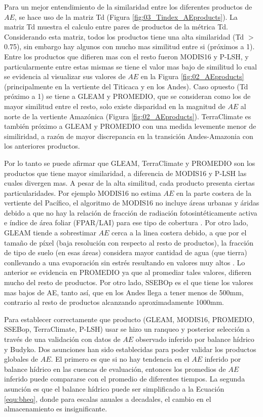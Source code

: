 \documentclass[12pt]{article}
\begin{document}
Para un mejor entendimiento de la similaridad entre los diferentes productos de $AE$, se hace uso de la matriz Td (Figura \ref{fig:03_Tindex_AEproducts}). La matriz Td muestra el calculo entre pares de productos de la métrica Td. Considerando esta matriz, todos los productos tiene una alta similaridad (Td $>$ 0.75), sin embargo hay algunos con mucho mas similitud entre si (próximos a 1). Entre los productos que difieren mas con el resto fueron MODIS16 y P-LSH, y particularmente entre estas mismas se tiene el valor mas bajo de similitud lo cual se evidencia al visualizar sus valores de $AE$ en la Figura \ref{fig:02_AEproducts} (principalmente en la vertiente del Titicaca y en los Andes). Caso opuesto (Td próximo a 1) se tiene a GLEAM y PROMEDIO, que se consideran como los de mayor similitud entre el resto, solo existe disparidad en la magnitud de $AE$ al norte de la vertiente Amazónica (Figura \ref{fig:02_AEproducts}). TerraClimate es también próximo a GLEAM y PROMEDIO con una medida levemente menor de similiridad, a razón de mayor discrepancia en la transición Andes-Amazonia con los anteriores productos.

Por lo tanto se puede afirmar que GLEAM, TerraClimate y PROMEDIO son los productos que tiene mayor similaridad, a diferencia de MODIS16 y P-LSH las cuales divergen mas. A pesar de la alta similitud, cada producto presenta ciertas particularidades. Por ejemplo MODIS16 no estima $AE$ en la parte costera de la vertiente del Pacífico, el algoritmo de MODIS16 no incluye áreas urbanas y áridas debido a que no hay la relación de fracción de radiación fotosintéticamente activa e índice de área foliar (FPAR/LAI) para ese tipo de cobertura \citep{mu2013modis}. Por otro lado, GLEAM tiende a sobrestimar $AE$ cerca a la linea costera debido, a que por el tamaño de píxel (baja resolución con respecto al resto de productos), la fracción de tipo de suelo (en esas áreas) considera mayor cantidad de agua (que tierra) conllevando a una evaporación sin estrés resultando en valores muy altos \citep{Martens2017}. Lo anterior se evidencia en PROMEDIO ya que al promediar tales valores, difieren mucho del resto de productos. Por otro lado, SSEBOp es el que tiene los valores mas bajos de AE, tanto así, que en los Andes llega a tener menos de 500mm, contrario al resto de productos alcanzando aproximadamente 1000mm.

\vspace*{.5cm}


Para establecer correctamente que producto (GLEAM, MODIS16, PROMEDIO, SSEBop, TerraClimate, P-LSH) usar se hizo un ranqueo y posterior selección a través de una validación con datos de $AE$ observado inferido por balance hídrico y Budyko. Dos asunciones han sido establecidas para poder validar los productos globales de $AE$. El primero es que si no hay tendencia en el $AE$ inferido por balance hídrico en las cuencas de evaluación, entonces los promedios de $AE$ inferido puede compararse con el promedio de diferentes tiempos. La segunda asunción es que el balance hídrico puede ser simplificado a la Ecuación \ref{equ:bheq}, donde para escalas anuales a decadales, el cambio en el almacenamiento es insignificante.
\end{document}
